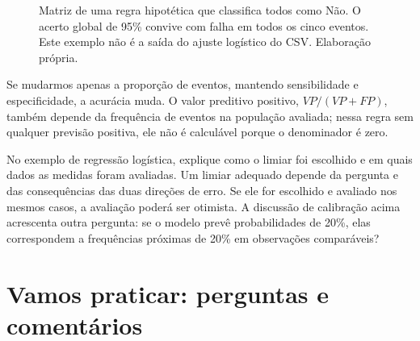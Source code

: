 \begin{figure}[H]
\centering
{}
\caption{Matriz de uma regra hipotética que classifica todos como Não. O acerto global de 95\% convive com falha em todos os cinco eventos. Este exemplo não é a saída do ajuste logístico do CSV. Elaboração própria.}
\label{fig:classificacao-majoritaria}
\end{figure}

Se mudarmos apenas a proporção de eventos, mantendo sensibilidade e especificidade, a acurácia muda. O valor preditivo positivo, $VP/(VP+FP)$, também depende da frequência de eventos na população avaliada; nessa regra sem qualquer previsão positiva, ele não é calculável porque o denominador é zero.

No exemplo de regressão logística, explique como o limiar foi escolhido e em quais dados as medidas foram avaliadas. Um limiar adequado depende da pergunta e das consequências das duas direções de erro. Se ele for escolhido e avaliado nos mesmos casos, a avaliação poderá ser otimista. A discussão de calibração acima acrescenta outra pergunta: se o modelo prevê probabilidades de 20\%, elas correspondem a frequências próximas de 20\% em observações comparáveis?

\section{Vamos praticar: perguntas e comentários}

